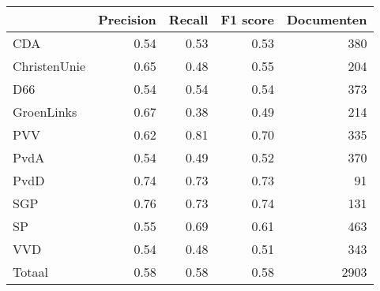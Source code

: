 \begin{tabular}{lrrrr}
\toprule
{} &  Precision &  Recall &  F1 score &  Documenten \\
\midrule
CDA          &       0.54 &    0.53 &      0.53 &         380 \\
ChristenUnie &       0.65 &    0.48 &      0.55 &         204 \\
D66          &       0.54 &    0.54 &      0.54 &         373 \\
GroenLinks   &       0.67 &    0.38 &      0.49 &         214 \\
PVV          &       0.62 &    0.81 &      0.70 &         335 \\
PvdA         &       0.54 &    0.49 &      0.52 &         370 \\
PvdD         &       0.74 &    0.73 &      0.73 &          91 \\
SGP          &       0.76 &    0.73 &      0.74 &         131 \\
SP           &       0.55 &    0.69 &      0.61 &         463 \\
VVD          &       0.54 &    0.48 &      0.51 &         343 \\
Totaal       &       0.58 &    0.58 &      0.58 &        2903 \\
\bottomrule
\end{tabular}
